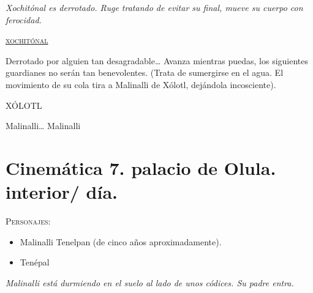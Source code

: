 \documentclass[11pt,letterpaper]{article}
\begin{document}
\textit{Xochitónal es derrotado. Ruge tratando de evitar su final, mueve su cuerpo con ferocidad. }

\begin{center}
\textsc{\underline{xochitónal}}
\\
\par
Derrotado por alguien tan desagradable… Avanza mientras puedas, los siguientes guardianes no serán tan benevolentes. (Trata de sumergirse en el agua. El movimiento de su cola tira a Malinalli de Xólotl, dejándola incosciente).
\\
\par
XÓLOTL
\\
\par
Malinalli… Malinalli
\end{center}

\section{Cinemática 7. palacio de Olula. interior/ día.}
\textsc{Personajes}:
\begin{itemize}
 \item Malinalli Tenelpan (de cinco años aproximadamente).
	\item Tenépal
\end{itemize}

\textit{Malinalli está durmiendo en el suelo al lado de unos códices. Su padre entra.} 
\end{document}
